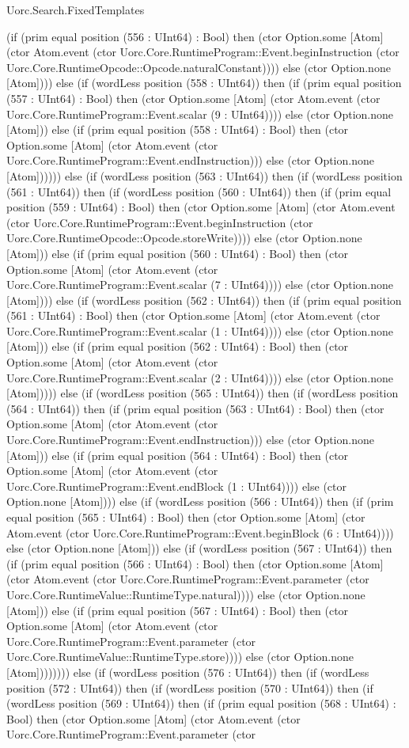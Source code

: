 \begin{lexlean}{Uorc.Search.FixedTemplates}
\begin{semanticmodule}
{(if (prim equal position (556 : UInt64) : Bool) then (ctor Option.some [Atom] (ctor Atom.event (ctor Uorc.Core.RuntimeProgram::Event.beginInstruction (ctor Uorc.Core.RuntimeOpcode::Opcode.naturalConstant)))) else (ctor Option.none [Atom]))) else (if (wordLess position (558 : UInt64)) then (if (prim equal position (557 : UInt64) : Bool) then (ctor Option.some [Atom] (ctor Atom.event (ctor Uorc.Core.RuntimeProgram::Event.scalar (9 : UInt64)))) else (ctor Option.none [Atom])) else (if (prim equal position (558 : UInt64) : Bool) then (ctor Option.some [Atom] (ctor Atom.event (ctor Uorc.Core.RuntimeProgram::Event.endInstruction))) else (ctor Option.none [Atom]))))) else (if (wordLess position (563 : UInt64)) then (if (wordLess position (561 : UInt64)) then (if (wordLess position (560 : UInt64)) then (if (prim equal position (559 : UInt64) : Bool) then (ctor Option.some [Atom] (ctor Atom.event (ctor Uorc.Core.RuntimeProgram::Event.beginInstruction (ctor Uorc.Core.RuntimeOpcode::Opcode.storeWrite)))) else (ctor Option.none [Atom])) else (if (prim equal position (560 : UInt64) : Bool) then (ctor Option.some [Atom] (ctor Atom.event (ctor Uorc.Core.RuntimeProgram::Event.scalar (7 : UInt64)))) else (ctor Option.none [Atom]))) else (if (wordLess position (562 : UInt64)) then (if (prim equal position (561 : UInt64) : Bool) then (ctor Option.some [Atom] (ctor Atom.event (ctor Uorc.Core.RuntimeProgram::Event.scalar (1 : UInt64)))) else (ctor Option.none [Atom])) else (if (prim equal position (562 : UInt64) : Bool) then (ctor Option.some [Atom] (ctor Atom.event (ctor Uorc.Core.RuntimeProgram::Event.scalar (2 : UInt64)))) else (ctor Option.none [Atom])))) else (if (wordLess position (565 : UInt64)) then (if (wordLess position (564 : UInt64)) then (if (prim equal position (563 : UInt64) : Bool) then (ctor Option.some [Atom] (ctor Atom.event (ctor Uorc.Core.RuntimeProgram::Event.endInstruction))) else (ctor Option.none [Atom])) else (if (prim equal position (564 : UInt64) : Bool) then (ctor Option.some [Atom] (ctor Atom.event (ctor Uorc.Core.RuntimeProgram::Event.endBlock (1 : UInt64)))) else (ctor Option.none [Atom]))) else (if (wordLess position (566 : UInt64)) then (if (prim equal position (565 : UInt64) : Bool) then (ctor Option.some [Atom] (ctor Atom.event (ctor Uorc.Core.RuntimeProgram::Event.beginBlock (6 : UInt64)))) else (ctor Option.none [Atom])) else (if (wordLess position (567 : UInt64)) then (if (prim equal position (566 : UInt64) : Bool) then (ctor Option.some [Atom] (ctor Atom.event (ctor Uorc.Core.RuntimeProgram::Event.parameter (ctor Uorc.Core.RuntimeValue::RuntimeType.natural)))) else (ctor Option.none [Atom])) else (if (prim equal position (567 : UInt64) : Bool) then (ctor Option.some [Atom] (ctor Atom.event (ctor Uorc.Core.RuntimeProgram::Event.parameter (ctor Uorc.Core.RuntimeValue::RuntimeType.store)))) else (ctor Option.none [Atom]))))))) else (if (wordLess position (576 : UInt64)) then (if (wordLess position (572 : UInt64)) then (if (wordLess position (570 : UInt64)) then (if (wordLess position (569 : UInt64)) then (if (prim equal position (568 : UInt64) : Bool) then (ctor Option.some [Atom] (ctor Atom.event (ctor Uorc.Core.RuntimeProgram::Event.parameter (ctor }
\end{semanticmodule}
\end{lexlean}
